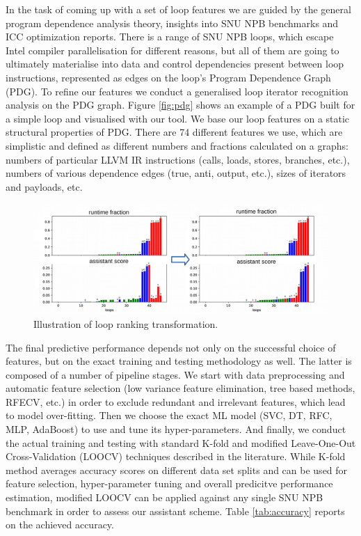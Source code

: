 \documentclass{acaces}
\begin{document}
\quad In the task of coming up with a set of loop features we are guided by the general program dependence analysis theory, insights into SNU NPB benchmarks and ICC optimization reports. There is a range of SNU NPB loops, which escape Intel compiler parallelisation for different reasons, but all of them are going to ultimately materialise into data and control dependencies present between loop instructions, represented as edges on the loop's Program Dependence Graph (PDG). To refine our features we conduct a generalised loop iterator recognition \cite{Manilov:2018:GPI:3178372.3179511} analysis on the PDG graph. Figure \ref{fig:pdg} shows an example of a PDG built for a simple loop and visualised with our tool. We base our loop features on a static structural properties of PDG. There are 74 different features we use, which are simplistic and defined as different numbers and fractions calculated on a graphs: numbers of particular LLVM IR instructions (calls, loads, stores, branches, etc.), numbers of various dependence edges (true, anti, output, etc.), sizes of iterators and payloads, etc.\newline\null
\begin{figure}
	\centering
	\includegraphics[width=1.0\textwidth]{ft_ranking}
	\caption{Illustration of loop ranking transformation.}
	\label{ranking}
\end{figure}
\quad The final predictive performance depends not only on the successful choice of features, but on the exact training and testing methodology as well. The latter is composed of a number of pipeline stages. We start with data preprocessing and automatic feature selection (low variance feature elimination, tree based methods, RFECV, etc.) in order to exclude redundant and irrelevant features, which lead to model over-fitting. Then we choose the exact ML model (SVC, DT, RFC, MLP, AdaBoost) to use and tune its hyper-parameters. And finally, we conduct the actual training and testing with standard K-fold and modified Leave-One-Out Cross-Validation (LOOCV)  techniques described in the literature. While K-fold method averages accuracy scores on different data set splits and can be used for feature selection, hyper-parameter tuning and overall predicitve performance estimation, modified LOOCV can be applied against any single SNU NPB benchmark in order to assess our assistant scheme. Table \ref{tab:accuracy} reports on the achieved accuracy.
\end{document}
